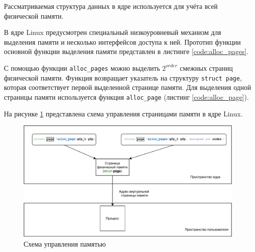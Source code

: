 Рассматриваемая структура данных в ядре используется для учёта всей физической памяти.

В ядре Linux предусмотрен специальный низкоуровневый механизм для выделения памяти и несколько интерфейсов доступа к ней. Прототип функции основной функции выделения памяти представлен в листинге \ref{code:alloc_pages}.


С помощью функции \texttt{alloc\_pages} можно выделить $2^{order}$ смежных страниц физической памяти. Функция возвращает указатель на структуру \texttt{struct page}, которая соответствует первой выделенной странице памяти. Для выделения одной страницы памяти используется функция \texttt{alloc\_page} (листинг \ref{code:alloc_page}).


На рисунке \ref{fig:memory_schema} представлена схема управления страницами памяти в ядре Linux.

\begin{figure}[h]
	\centering
	\includegraphics[width=\textwidth]{img/memory_schema.pdf}
	\caption{Схема управления памятью}
	\label{fig:memory_schema}
\end{figure}


